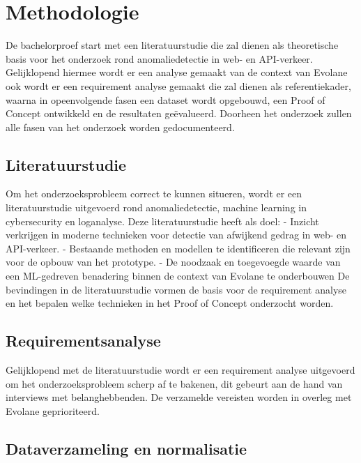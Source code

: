 \section{Methodologie}%
\label{sec:methodologie}

De bachelorproef start met een literatuurstudie die zal dienen als theoretische basis voor het onderzoek rond anomaliedetectie in web- en API-verkeer. Gelijklopend hiermee wordt er een analyse gemaakt van de context van Evolane ook wordt er een requirement analyse gemaakt die zal dienen als referentiekader, waarna in opeenvolgende fasen een dataset wordt opgebouwd, een Proof of Concept ontwikkeld en de resultaten geëvalueerd. Doorheen het onderzoek zullen alle fasen van het onderzoek worden gedocumenteerd. 

\subsection{Literatuurstudie}

Om het onderzoeksprobleem correct te kunnen situeren, wordt er een literatuurstudie uitgevoerd rond anomaliedetectie, machine learning in cybersecurity en loganalyse. Deze literatuurstudie heeft als doel: 
- Inzicht verkrijgen in moderne technieken voor detectie van afwijkend gedrag in web- en API-verkeer. 
- Bestaande methoden en modellen te identificeren die relevant zijn voor de opbouw van het prototype. 
- De noodzaak en toegevoegde waarde van een ML-gedreven benadering binnen de context van Evolane te onderbouwen
De bevindingen in de literatuurstudie vormen de basis voor de requirement analyse en het bepalen welke technieken in het Proof of Concept onderzocht worden. 


\subsection{Requirementsanalyse }

Gelijklopend met de literatuurstudie wordt er een requirement analyse uitgevoerd om het onderzoeksprobleem scherp af te bakenen, dit gebeurt aan de hand van interviews met belanghebbenden. De verzamelde vereisten worden in overleg met Evolane geprioriteerd. 

\subsection{Dataverzameling en normalisatie}

